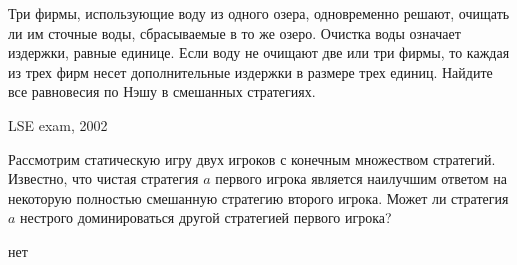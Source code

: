\begin{problem}[Экология]
\begin{source}
\cite[6.5]{gintis:gte}\end{source}
Три фирмы, использующие воду из одного озера, одновременно решают, очищать ли им сточные воды, сбрасываемые в то же озеро. Очистка воды означает издержки, равные единице. Если воду не очищают две или три фирмы, то каждая из трех фирм несет дополнительные издержки в размере трех единиц.
Найдите все равновесия по Нэшу в смешанных стратегиях.



\begin{sol}

\end{sol}
\end{problem}







\begin{problem}
\begin{source}
LSE exam, 2002
\end{source}
 Рассмотрим статическую игру двух игроков с конечным множеством стратегий. Известно, что чистая стратегия  $a$  первого игрока является наилучшим ответом на некоторую полностью смешанную стратегию второго игрока.
Может ли стратегия  $a$  нестрого доминироваться другой стратегией первого игрока?

\begin{sol}
нет
\end{sol}
\end{problem}







